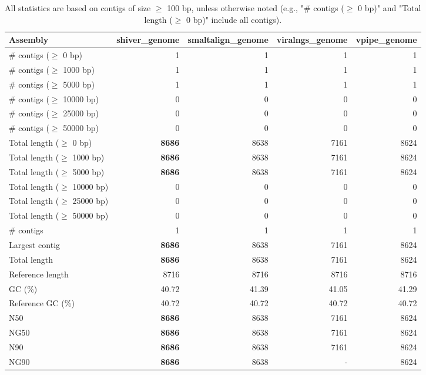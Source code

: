 \documentclass[12pt,a4paper]{article}
\begin{document}
\begin{table}[ht]
\begin{center}
\caption{All statistics are based on contigs of size $\geq$ 100 bp, unless otherwise noted (e.g., "\# contigs ($\geq$ 0 bp)" and "Total length ($\geq$ 0 bp)" include all contigs).}
\begin{tabular}{|l*{4}{|r}|}
\hline
Assembly & shiver\_genome & smaltalign\_genome & viralngs\_genome & vpipe\_genome \\ \hline
\# contigs ($\geq$ 0 bp) & 1 & 1 & 1 & 1 \\ \hline
\# contigs ($\geq$ 1000 bp) & 1 & 1 & 1 & 1 \\ \hline
\# contigs ($\geq$ 5000 bp) & 1 & 1 & 1 & 1 \\ \hline
\# contigs ($\geq$ 10000 bp) & 0 & 0 & 0 & 0 \\ \hline
\# contigs ($\geq$ 25000 bp) & 0 & 0 & 0 & 0 \\ \hline
\# contigs ($\geq$ 50000 bp) & 0 & 0 & 0 & 0 \\ \hline
Total length ($\geq$ 0 bp) & {\bf 8686} & 8638 & 7161 & 8624 \\ \hline
Total length ($\geq$ 1000 bp) & {\bf 8686} & 8638 & 7161 & 8624 \\ \hline
Total length ($\geq$ 5000 bp) & {\bf 8686} & 8638 & 7161 & 8624 \\ \hline
Total length ($\geq$ 10000 bp) & 0 & 0 & 0 & 0 \\ \hline
Total length ($\geq$ 25000 bp) & 0 & 0 & 0 & 0 \\ \hline
Total length ($\geq$ 50000 bp) & 0 & 0 & 0 & 0 \\ \hline
\# contigs & 1 & 1 & 1 & 1 \\ \hline
Largest contig & {\bf 8686} & 8638 & 7161 & 8624 \\ \hline
Total length & {\bf 8686} & 8638 & 7161 & 8624 \\ \hline
Reference length & 8716 & 8716 & 8716 & 8716 \\ \hline
GC (\%) & 40.72 & 41.39 & 41.05 & 41.29 \\ \hline
Reference GC (\%) & 40.72 & 40.72 & 40.72 & 40.72 \\ \hline
N50 & {\bf 8686} & 8638 & 7161 & 8624 \\ \hline
NG50 & {\bf 8686} & 8638 & 7161 & 8624 \\ \hline
N90 & {\bf 8686} & 8638 & 7161 & 8624 \\ \hline
NG90 & {\bf 8686} & 8638 & - & 8624 \\ \hline

\end{tabular}
\end{center}
\end{table}
\end{document}
